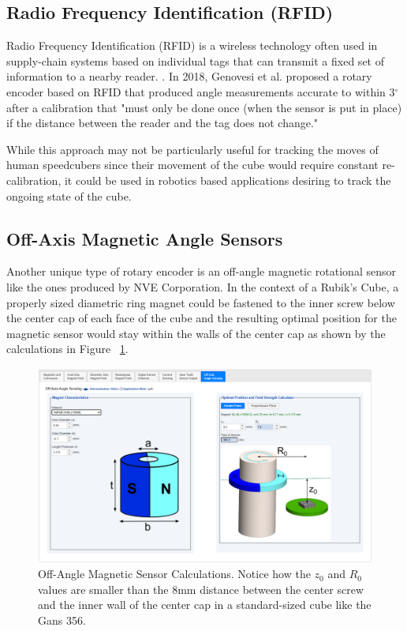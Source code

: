 \subsection{Radio Frequency Identification (RFID)}
Radio Frequency Identification (RFID) is a wireless technology often used in supply-chain systems \cite{rfid-rotary-encoder} based on individual tags that can transmit a fixed set of information to a nearby reader. \cite{fda-rfid}.
In 2018, Genovesi et al. proposed a rotary encoder based on RFID that produced angle measurements accurate to within 3$^\circ$ after a calibration that "must only be done once (when the sensor is put in place) if the distance between the reader and the tag does not change." \cite{rfid-rotary-encoder}

While this approach may not be particularly useful for tracking the moves of human speedcubers since their movement of the cube would require constant re-calibration, it could be used in robotics based applications desiring to track the ongoing state of the cube.

\subsection{Off-Axis Magnetic Angle Sensors}
Another unique type of rotary encoder is an off-angle magnetic rotational sensor like the ones produced by NVE Corporation. \cite{nve-mag-sensor} In the context of a Rubik's Cube, a properly sized diametric ring magnet could be fastened to the inner screw below the center cap of each face of the cube and the resulting optimal position for the magnetic sensor would stay within the walls of the center cap as shown by the calculations in Figure ~\ref{fig:nve-mag-calculations}.

\begin{figure}
    \centering
    \includegraphics[width=\linewidth]{Figures/3 State of the Art/nve-mag-calculations.png}
    \decoRule
    \caption[Off-Angle Magnetic Sensor Calculations]{Off-Angle Magnetic Sensor Calculations. Notice how the $z_0$ and $R_0$ values are smaller than the 8mm distance between the center screw and the inner wall of the center cap in a standard-sized cube like the Gans 356. \cite{nve-mag-sensor-calculations}}
    \label{fig:nve-mag-calculations}
\end{figure}


